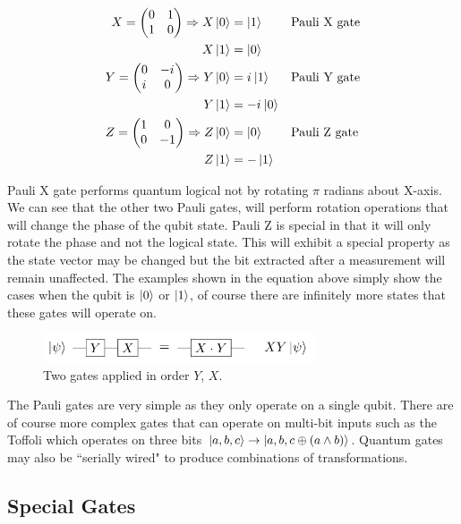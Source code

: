 \documentclass[conference]{IEEEtran}
\newcommand{\iu}{{i\mkern1mu}}
\begin{document}
\begin{align*}
X = \begin{pmatrix}
	0 & 1\\
	1 & 0
\end{pmatrix} \Rightarrow X \ket{0} &= \ket{1} && \text{Pauli X gate}\\
X\ket{1} &= \ket{0}\\
Y = \begin{pmatrix}
	0 & -\iu\\
	\iu & 0
\end{pmatrix} \Rightarrow Y \ket{0} &= \iu\ket{1} && \text{Pauli Y gate}\\
Y\ket{1} &= -\iu\ket{0}\\
Z = \begin{pmatrix}
	1 & 0\\
	0 & -1
\end{pmatrix} \Rightarrow Z \ket{0} &= \ket{0} && \text{Pauli Z gate}\\
Z\ket{1} &= -\ket{1}
\end{align*}

Pauli X gate performs quantum logical not by rotating $\pi$ radians about X-axis. We can see that the other two Pauli gates, will perform rotation operations that will change the phase of the qubit state. Pauli Z is special in that it will only rotate the phase and not the logical state. This will exhibit a special property as the state vector may be changed but the bit extracted after a measurement will remain unaffected. The examples shown in the equation above simply show the cases when the qubit is $\ket{0}$ or $\ket{1}$, of course there are infinitely more states that these gates will operate on.\cite{b5}

\begin{figure}[htbp]
\centerline{\includegraphics[width=8cm]{serially_pauli_xy.png}}
\caption{Two gates applied in order $Y$, $X$.}
\label{serial_pauli}
\end{figure}

The Pauli gates are very simple as they only operate on a single qubit. There are of course more complex gates that can operate on multi-bit inputs such as the Toffoli which operates on three bits $\ket{a,b,c} \rightarrow\ket{a,b,c \oplus (a \land b)}$. Quantum gates may also be ``serially wired" to produce combinations of transformations.

\subsection{Special Gates}
\end{document}
